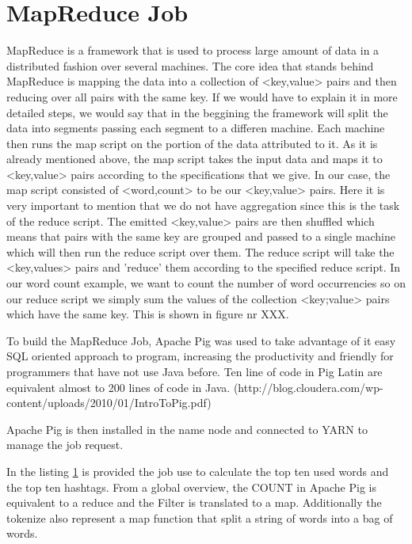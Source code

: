 \documentclass{article}
\begin{document}
        \section{MapReduce Job}

MapReduce is a framework that is used to process large amount of data in a distributed fashion over several machines. The core idea that stands behind MapReduce is mapping the data into a collection of <key,value> pairs and then reducing over all pairs with the same key. If we would have to explain it in more detailed steps, we would say that in the beggining the framework will split the data into segments passing each segment to a differen machine. Each machine then runs the map script on the portion of the data attributed to it. As it is already mentioned above, the map script takes the input data and maps it to <key,value> pairs according to the specifications that we give. In our case, the map script consisted of <word,count> to be our <key,value> pairs. Here it is very important to mention that we do not have aggregation since this is the task of the reduce script. The emitted <key,value> pairs are then shuffled which means that pairs with the same key are grouped and passed to a single machine which will then run the reduce script over them. The reduce script will take the <key,values> pairs and 'reduce' them according to the specified reduce script. In our word count example, we want to count the number of word occurrencies so on our reduce script we simply sum the values of the collection <key;value> pairs which have the same key. This is shown in figure nr XXX. 


        To build the MapReduce Job, Apache Pig was used to take advantage of it easy SQL oriented approach to program, increasing the productivity and friendly for programmers that have not use Java before.
        Ten line of code in Pig Latin are equivalent almost to 200 lines of code in Java. (http://blog.cloudera.com/wp-content/uploads/2010/01/IntroToPig.pdf)

        Apache Pig is then installed in the name node and connected to YARN to manage the job request. 
        
        In the listing \ref{} is provided the job use to calculate the top ten used words and the top ten hashtags. From a global overview, the COUNT in Apache Pig is equivalent to a reduce and the Filter is translated to a map.
        Additionally the tokenize also represent a  map function that split a string of words into a bag of words.
\end{document}
